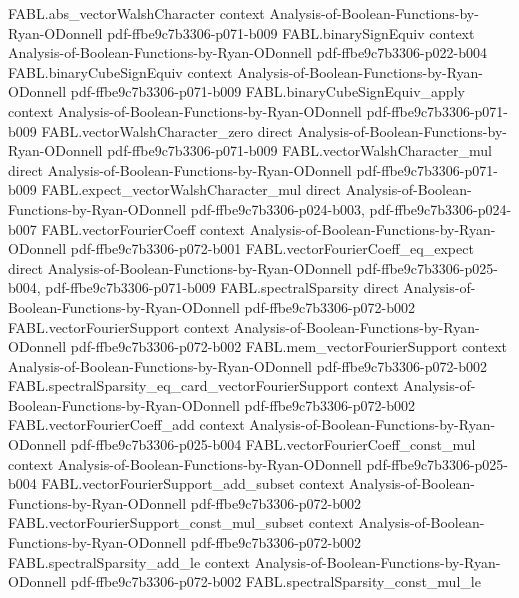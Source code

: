 \begin{theorem}
\proofstep
  {FABL.abs_vectorWalshCharacter}
  {context}
  {Analysis-of-Boolean-Functions-by-Ryan-ODonnell}
  {pdf-ffbe9c7b3306-p071-b009}
\proofstep
  {FABL.binarySignEquiv}
  {context}
  {Analysis-of-Boolean-Functions-by-Ryan-ODonnell}
  {pdf-ffbe9c7b3306-p022-b004}
\proofstep
  {FABL.binaryCubeSignEquiv}
  {context}
  {Analysis-of-Boolean-Functions-by-Ryan-ODonnell}
  {pdf-ffbe9c7b3306-p071-b009}
\proofstep
  {FABL.binaryCubeSignEquiv_apply}
  {context}
  {Analysis-of-Boolean-Functions-by-Ryan-ODonnell}
  {pdf-ffbe9c7b3306-p071-b009}
\proofstep
  {FABL.vectorWalshCharacter_zero}
  {direct}
  {Analysis-of-Boolean-Functions-by-Ryan-ODonnell}
  {pdf-ffbe9c7b3306-p071-b009}
\proofstep
  {FABL.vectorWalshCharacter_mul}
  {direct}
  {Analysis-of-Boolean-Functions-by-Ryan-ODonnell}
  {pdf-ffbe9c7b3306-p071-b009}
\proofstep
  {FABL.expect_vectorWalshCharacter_mul}
  {direct}
  {Analysis-of-Boolean-Functions-by-Ryan-ODonnell}
  {pdf-ffbe9c7b3306-p024-b003,
    pdf-ffbe9c7b3306-p024-b007}
\proofstep
  {FABL.vectorFourierCoeff}
  {context}
  {Analysis-of-Boolean-Functions-by-Ryan-ODonnell}
  {pdf-ffbe9c7b3306-p072-b001}
\proofstep
  {FABL.vectorFourierCoeff_eq_expect}
  {direct}
  {Analysis-of-Boolean-Functions-by-Ryan-ODonnell}
  {pdf-ffbe9c7b3306-p025-b004,
    pdf-ffbe9c7b3306-p071-b009}
\proofstep
  {FABL.spectralSparsity}
  {direct}
  {Analysis-of-Boolean-Functions-by-Ryan-ODonnell}
  {pdf-ffbe9c7b3306-p072-b002}
\proofstep
  {FABL.vectorFourierSupport}
  {context}
  {Analysis-of-Boolean-Functions-by-Ryan-ODonnell}
  {pdf-ffbe9c7b3306-p072-b002}
\proofstep
  {FABL.mem_vectorFourierSupport}
  {context}
  {Analysis-of-Boolean-Functions-by-Ryan-ODonnell}
  {pdf-ffbe9c7b3306-p072-b002}
\proofstep
  {FABL.spectralSparsity_eq_card_vectorFourierSupport}
  {context}
  {Analysis-of-Boolean-Functions-by-Ryan-ODonnell}
  {pdf-ffbe9c7b3306-p072-b002}
\proofstep
  {FABL.vectorFourierCoeff_add}
  {context}
  {Analysis-of-Boolean-Functions-by-Ryan-ODonnell}
  {pdf-ffbe9c7b3306-p025-b004}
\proofstep
  {FABL.vectorFourierCoeff_const_mul}
  {context}
  {Analysis-of-Boolean-Functions-by-Ryan-ODonnell}
  {pdf-ffbe9c7b3306-p025-b004}
\proofstep
  {FABL.vectorFourierSupport_add_subset}
  {context}
  {Analysis-of-Boolean-Functions-by-Ryan-ODonnell}
  {pdf-ffbe9c7b3306-p072-b002}
\proofstep
  {FABL.vectorFourierSupport_const_mul_subset}
  {context}
  {Analysis-of-Boolean-Functions-by-Ryan-ODonnell}
  {pdf-ffbe9c7b3306-p072-b002}
\proofstep
  {FABL.spectralSparsity_add_le}
  {context}
  {Analysis-of-Boolean-Functions-by-Ryan-ODonnell}
  {pdf-ffbe9c7b3306-p072-b002}
\proofstep
  {FABL.spectralSparsity_const_mul_le}

\end{theorem}

